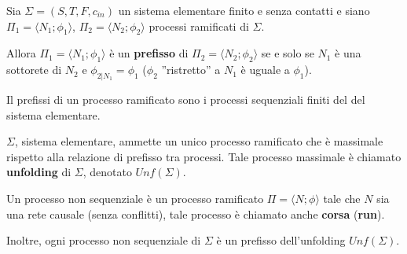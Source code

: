 \begin{definizione}
    Sia $\Sigma = (S,T, F, c_{in})$ un sistema elementare finito e senza contatti
    e siano $\Pi_1 = \langle N_1; \phi_1 \rangle$, $\Pi_2 = \langle N_2; \phi_2 \rangle$
    processi ramificati di $\Sigma$.

    Allora $\Pi_1 = \langle N_1; \phi_1 \rangle$ è un \textbf{prefisso} di
    $\Pi_2 = \langle N_2; \phi_2 \rangle$ se e solo se $N_1$ è una sottorete di
    $N_2$ e $\phi_{2|N_1} = \phi_1$ ($\phi_2$ ”ristretto” a $N_1$ è uguale a $\phi_1$).
\end{definizione}

\begin{nota}
    Il prefissi di un processo ramificato sono i processi sequenziali finiti del
    del sistema elementare.
\end{nota}

\begin{definizione}
    $\Sigma$, sistema elementare, ammette un unico processo ramificato che è massimale rispetto alla
    relazione di prefisso tra processi. Tale processo massimale è chiamato
    \textbf{unfolding} di $\Sigma$, denotato $Unf (\Sigma)$.
\end{definizione}
\begin{definizione}
    Un processo non sequenziale è un processo ramificato $\Pi = \langle N; \phi \rangle$
    tale che $N$ sia una rete causale (senza conflitti), tale processo è chiamato
    anche \textbf{corsa} (\textbf{run}).
\end{definizione}
\begin{osservazione}
    Inoltre, ogni processo non sequenziale di $\Sigma$ è un prefisso dell'unfolding
    $Unf (\Sigma)$.
\end{osservazione}

